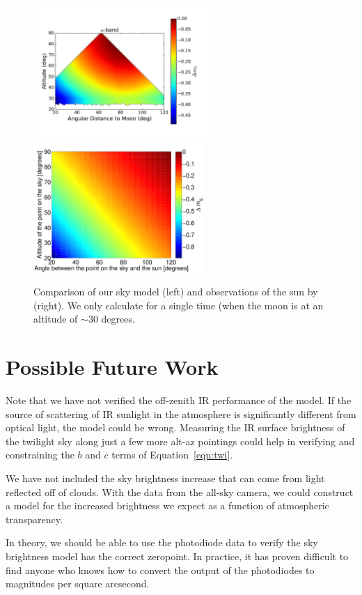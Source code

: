 \documentclass[]{spie}
\begin{document}
\begin{figure}
  \includegraphics[height=5cm]{plots/deltam5.pdf}\includegraphics[height=5cm]{plots/a1_alt_angle_meshgrid.pdf}
  \caption{ Comparison of our sky model (left) and observations of the sun by \cite{Coughlin15} (right).  We only calculate for a single time (when the moon is at an altitude of $\sim 30$ degrees. \label{fig:cCompare}}
\end{figure}



\section{Possible Future Work}

Note that we have not verified the off-zenith IR performance of the model. If the source of scattering of IR sunlight in the atmosphere is significantly different from optical light, the model could be wrong. Measuring the IR surface brightness of the twilight sky along just a few more alt-az pointings could help in verifying and constraining the $b$ and $c$ terms of Equation~\ref{eqn:twi}.

We have not included the sky brightness increase that can come from light reflected off of clouds.  With the data from the all-sky camera, we could construct a model for the increased brightness we expect as a function of atmospheric transparency.  

In theory, we should be able to use the photodiode data to verify the sky brightness model has the correct zeropoint. In practice, it has proven difficult to find anyone who knows how to convert the output of the photodiodes to magnitudes per square arcsecond.
\end{document}
